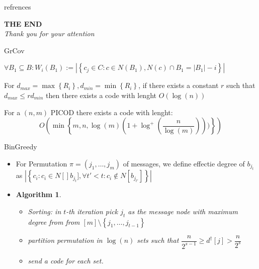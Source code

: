 \documentclass[xcolor=dvipsnames, aspectratio=169]{beamer}
\newtheorem{algg}[theorem]{Algorithm}
\newcommand{\set}[1]{\left\{ #1 \right\}}
\newcommand{\card}[1]{\left|{#1}\right|}
\begin{document}
\begin{frame}{refrences}
	\printbibliography
	
\end{frame}
\begin{frame}
    \centering
    \vspace{1cm}
    \hspace{2cm}  \textbf{\Huge{THE END}} \\
    \vspace{0.5cm}
    \textit{\Large{Thank you for your attention}}
\end{frame}


\begin{frame}{GrCov}
	\begin{definition}
		$\forall B_1 \subseteq B: W_i(B_1) := \card{\set{c_j \in C: c \in N(B_1), N(c) \cap B_1 = |B_1| - i }}$
	\end{definition}
	\begin{lemma}
		For $d_{max} = \max\set{R_i}, d_{min} = \min\set{R_i}$, if there exists a constant $r$ such that $d_{max} \leq r d_{min}$ then there exists a code with lenght $O(\log(n))$
	\end{lemma}
	\begin{theorem}
		For a $(n, m)$ PICOD there exists a code with lenght:
			$$O(\min\set{m, n, \log(m)(1 + \log^{+}(\dfrac{n}{\log(m)}) ))})$$
	\end{theorem}
\end{frame}
\begin{frame}{BinGreedy}
			\begin{itemize}
				\item<1->[]
	\begin{definition}
		For Permutation $\pi = (j_1, \ldots, j_m)$ of messages, we define effectie degree of $b_{j_t}$ as $\card{\set{c_i: c_i \in N[]b_{j_t}], \forall t' < t: c_i \notin N[b_{j_{t'}}]}}$
	\end{definition}
	\item<2->[]
	\begin{algg}
		\begin{itemize}
			\item<2-> Sorting: in $t$-th iteration pick $j_t$ as the message node with maximum degree from from $[m] \setminus \set{j_1, \ldots, j_{t - 1}}$
			\item<3-> partition permutation in $\log(n)$ sets such that $\dfrac{n}{2^{s - 1}} \geq d^\dagger[j] > \dfrac{n}{2^s}$
			\item<4-> send a code for each set.
		\end{itemize}
	\end{algg}
			\end{itemize}
\end{frame}
\end{document}
